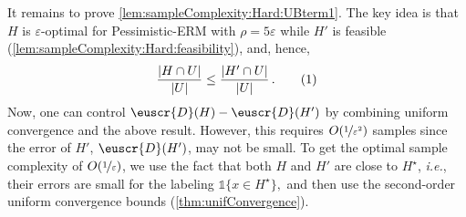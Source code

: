 \documentclass[11pt]{article}
\theoremstyle{plain}
\theoremstyle{definition}
\theoremstyle{remark}
\newcommand{\yesnum}{\addtocounter{equation}{1}\tag{\theequation}}
\def\abs#1{\left| #1 \right|}
\newcommand{\sinbrace}[1]{\{#1\}}
\newcommand{\nfrac}[2]{\nicefrac{#1}{#2}}
\newcommand{\eps}{\varepsilon}
\newcommand{\customcal}[1]{\euscr{#1}}
\newcommand{\cD}{\customcal{D}}
\newcommand{\ie}{\textit{i.e.}}
\newcommand{\pERM}{Pessimistic-ERM}
\newcommand{\optset}{{H^\star}}
\begin{document}
            It remains to prove \cref{lem:sampleComplexity:Hard:UBterm1}.
            The key idea is that $H$ is $\eps$-optimal for \pERM{} with $\rho=5\eps$ while $H'$ is feasible (\cref{lem:sampleComplexity:Hard:feasibility}), and, hence,
            \[
                \frac{\abs{H\cap U}}{\abs{U}}
                \leq 
                \frac{\abs{H'\cap U}}{\abs{U}}\,.
                \yesnum\label{eq:sampleComplexity:optimalityOfH}
            \]
            Now, one can control $\cD(H)-\cD(H')$ by combining uniform convergence and the above result.
            However, this requires $O(\nfrac{1}{\eps^2})$ samples since the error of $H'$, $\cD(H')$, may not be small. 
            To get the optimal sample complexity of $O(\nfrac{1}{\eps})$, we use the fact that both $H$ and $H'$ are close to $\optset$, \ie{}, their errors are small for the labeling $\mathds{1}\sinbrace{x\in \optset},$ and then use the second-order uniform convergence bounds (\cref{thm:unifConvergence}).
\end{document}
